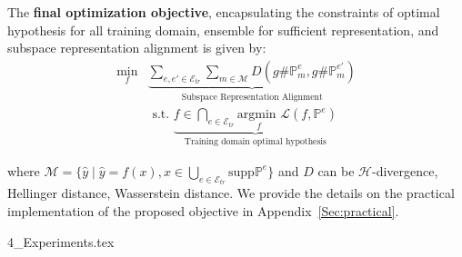 The \textbf{final optimization objective}, encapsulating the constraints of optimal hypothesis for all training domain, ensemble for sufficient representation, and subspace representation alignment is given by:
\begin{align}
\min_{f} &\underset{\text{Subspace Representation Alignment}}{\underbrace{\sum_{e,e'\in \mathcal{E}_{tr}}\sum_{m\in \mathcal{M}}D\left( g\#\mathbb{P}_m^{e},g\#\mathbb{P}_m^{e'}\right)}}\\
&\text{ s.t. } \underset{\text{Training domain optimal hypothesis}}{\underbrace{f\in \bigcap_{e\in \mathcal{E}_{tr}}\underset{ f}{\text{argmin }} \mathcal{L}\left(f,\mathbb{P}^{e}\right)}} \nonumber
\label{eq:final_objective}
\end{align}


where $\mathcal{M}=\{\hat{y}\mid \hat{y}=f(x), x\in\bigcup_{e\in\mathcal{E}_{tr}}\text{supp}\mathbb{P}^{e} \}$ and $D$ can be $\mathcal{H}$-divergence, Hellinger distance, Wasserstein distance. We provide the details on the practical implementation of the proposed objective in Appendix~\ref{Sec:practical}.

{4_Experiments.tex}